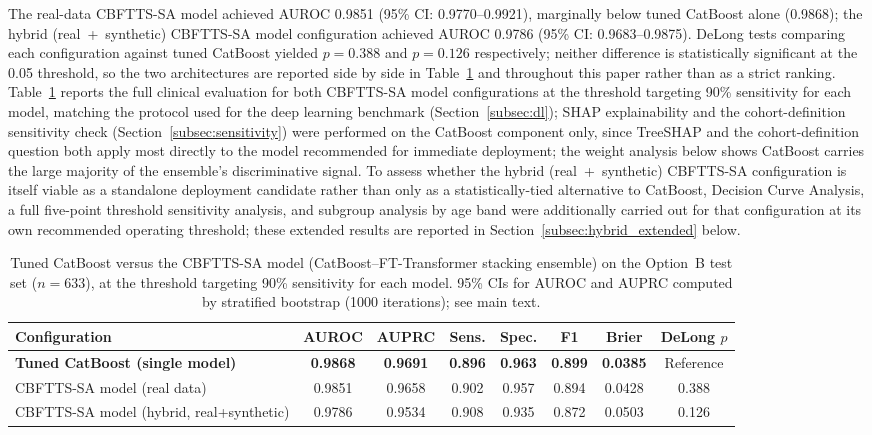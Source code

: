 \documentclass[final,3p,times]{elsarticle}
\begin{document}
The real-data CBFTTS-SA model achieved AUROC 0.9851 (95\% CI: 0.9770--0.9921),
marginally below tuned CatBoost alone (0.9868); the hybrid
(real~+~synthetic) CBFTTS-SA model configuration achieved AUROC 0.9786 (95\%
CI: 0.9683--0.9875). DeLong tests comparing each configuration
against tuned CatBoost yielded $p = 0.388$ and $p = 0.126$
respectively; neither difference is statistically significant at the
0.05 threshold, so the two architectures are reported side by side
in Table~\ref{tab:tu_comparison} and throughout this paper rather
than as a strict ranking. Table~\ref{tab:tu_comparison} reports the
full clinical evaluation for both CBFTTS-SA model configurations at the
threshold targeting 90\% sensitivity for each model, matching the
protocol used for the deep learning benchmark
(Section~\ref{subsec:dl}); SHAP explainability and the
cohort-definition sensitivity check (Section~\ref{subsec:sensitivity})
were performed on the CatBoost component only, since TreeSHAP and
the cohort-definition question both apply most directly to the
model recommended for immediate deployment; the weight analysis
below shows CatBoost carries the large majority of the ensemble's
discriminative signal. To assess whether the hybrid (real~+~synthetic)
CBFTTS-SA configuration is itself viable as a standalone deployment
candidate rather than only as a statistically-tied alternative to
CatBoost, Decision Curve Analysis, a full five-point threshold
sensitivity analysis, and subgroup analysis by age band were
additionally carried out for that configuration at its own
recommended operating threshold; these extended results are reported
in Section~\ref{subsec:hybrid_extended} below.

\begin{table}[htbp]
\centering
\caption{Tuned CatBoost versus the CBFTTS-SA model (CatBoost--FT-Transformer
stacking ensemble) on the Option~B test set ($n = 633$), at the
threshold targeting 90\% sensitivity for each model. 95\% CIs for
AUROC and AUPRC computed by stratified bootstrap (1000 iterations);
see main text.}
\label{tab:tu_comparison}
\small
\begin{tabular}{lccccccc}
\toprule
\textbf{Configuration} & \textbf{AUROC} & \textbf{AUPRC} &
\textbf{Sens.} & \textbf{Spec.} & \textbf{F1} & \textbf{Brier} &
\textbf{DeLong $p$} \\
\midrule
\textbf{Tuned CatBoost (single model)} & \textbf{0.9868} &
\textbf{0.9691} & \textbf{0.896} & \textbf{0.963} & \textbf{0.899} &
\textbf{0.0385} & Reference \\
CBFTTS-SA model (real data) & 0.9851 & 0.9658 & 0.902 & 0.957 & 0.894 &
0.0428 & 0.388 \\
CBFTTS-SA model (hybrid, real+synthetic) & 0.9786 & 0.9534 & 0.908 & 0.935
& 0.872 & 0.0503 & 0.126 \\
\bottomrule
\end{tabular}
\end{table}
\end{document}
